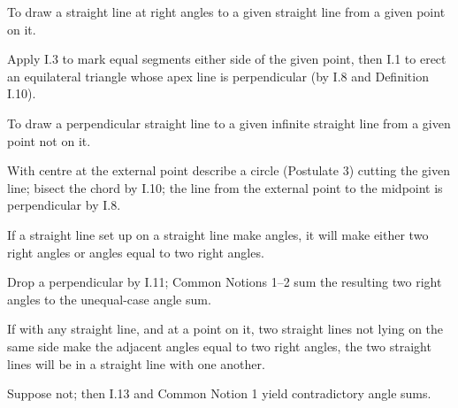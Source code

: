 \begin{claim}
\label{prop:I.11}
To draw a straight line at right angles to a given straight line from
a given point on it.
\end{claim}
\begin{evidence}[Proof of I.11]
\label{ev:I.11}
Apply I.3 to mark equal segments either side of the given point, then
I.1 to erect an equilateral triangle whose apex line is perpendicular
(by I.8 and Definition I.10).
\end{evidence}

\begin{claim}
\label{prop:I.12}
To draw a perpendicular straight line to a given infinite straight
line from a given point not on it.
\end{claim}
\begin{evidence}[Proof of I.12]
\label{ev:I.12}
With centre at the external point describe a circle (Postulate 3)
cutting the given line; bisect the chord by I.10; the line from the
external point to the midpoint is perpendicular by I.8.
\end{evidence}

\begin{claim}
\label{prop:I.13}
If a straight line set up on a straight line make angles, it will
make either two right angles or angles equal to two right angles.
\end{claim}
\begin{evidence}[Proof of I.13]
\label{ev:I.13}
Drop a perpendicular by I.11; Common Notions 1--2 sum the resulting
two right angles to the unequal-case angle sum.
\end{evidence}

\begin{claim}
\label{prop:I.14}
If with any straight line, and at a point on it, two straight lines
not lying on the same side make the adjacent angles equal to two
right angles, the two straight lines will be in a straight line with
one another.
\end{claim}
\begin{evidence}[Proof of I.14]
\label{ev:I.14}
Suppose not; then I.13 and Common Notion 1 yield contradictory angle
sums.
\end{evidence}

